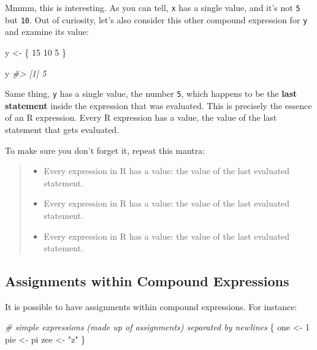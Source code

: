 \documentclass[
]{book}
\newenvironment{Shaded}{\begin{snugshade}}{\end{snugshade}}
\newcommand{\CommentTok}[1]{\textcolor[rgb]{0.56,0.35,0.01}{\textit{#1}}}
\newcommand{\DecValTok}[1]{\textcolor[rgb]{0.00,0.00,0.81}{#1}}
\newcommand{\NormalTok}[1]{#1}
\newcommand{\OtherTok}[1]{\textcolor[rgb]{0.56,0.35,0.01}{#1}}
\newcommand{\StringTok}[1]{\textcolor[rgb]{0.31,0.60,0.02}{#1}}
\begin{document}
Mmmm, this is interesting. As you can tell, \texttt{x} has a single value, and it's
not \texttt{5} but \texttt{10}. Out of curiosity, let's also consider this other compound
expression for \texttt{y} and examine its value:

\begin{Shaded}
\begin{Highlighting}[]
\NormalTok{y }\OtherTok{\textless{}{-}}\NormalTok{ \{}
  \DecValTok{15}
  \DecValTok{10}
  \DecValTok{5}
\NormalTok{\}}

\NormalTok{y}
\CommentTok{\#\textgreater{} [1] 5}
\end{Highlighting}
\end{Shaded}

Same thing, \texttt{y} has a single value, the number \texttt{5}, which happens to be the
\textbf{last statement} inside the expression that was evaluated. This is precisely
the essence of an R expression. Every R expression has a value, the value of
the last statement that gets evaluated.

To make sure you don't forget it, repeat this mantra:

\begin{quote}
\begin{itemize}
\item
  Every expression in R has a value: the value of the last evaluated statement.
\item
  Every expression in R has a value: the value of the last evaluated statement.
\item
  Every expression in R has a value: the value of the last evaluated statement.
\end{itemize}
\end{quote}

\hypertarget{assignments-within-compound-expressions}{%
\subsection{Assignments within Compound Expressions}\label{assignments-within-compound-expressions}}

It is possible to have assignments within compound expressions. For instance:

\begin{Shaded}
\begin{Highlighting}[]
\CommentTok{\# simple expressions (made up of assignments) separated by newlines}
\NormalTok{\{}
\NormalTok{  one }\OtherTok{\textless{}{-}} \DecValTok{1}
\NormalTok{  pie }\OtherTok{\textless{}{-}}\NormalTok{ pi}
\NormalTok{  zee }\OtherTok{\textless{}{-}} \StringTok{"z"}
\NormalTok{\}}
\end{Highlighting}
\end{Shaded}
\end{document}
